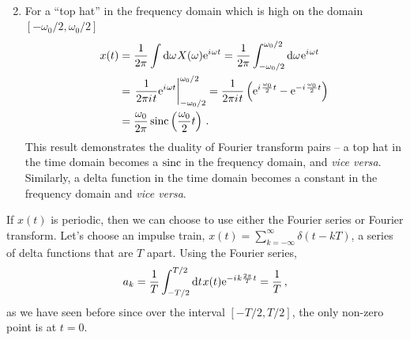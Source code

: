 \begin{enumerate}
\begin{align*}
  \end{align*}
\item For a ``top hat'' in the frequency domain which is high on the domain $[-\omega_0/2,\omega_0/2]$
  \begin{align*}
    x(t) &= \frac{1}{2\pi}\int \mathrm{d}\omega\mkern1muX(\omega)\mathrm{e}^{{i\mkern1mu}\omega t}
    = \frac{1}{2\pi}\int_{-\omega_0/2}^{\omega_0/2} \mathrm{d}\omega\mkern1mu \mathrm{e}^{{i\mkern1mu}\omega t} \\
    &= \left. \frac{1}{2\pi{i\mkern1mu} t} \mathrm{e}^{{i\mkern1mu}\omega t}\right|_{-\omega_0/2}^{\omega_0/2}
    = \frac{1}{2\pi{i\mkern1mu} t} \left(\mathrm{e}^{{i\mkern1mu}\frac{\omega_0}{2}t} - \mathrm{e}^{-{i\mkern1mu}\frac{\omega_0}{2}t}\right) \\
    &= \frac{\omega_0}{2\pi}\operatorname{sinc}\left(\frac{\omega_0}{2}t\right) \,.
  \end{align*}
  This result demonstrates the duality of Fourier transform pairs -- a top hat in the
  time domain becomes a $\operatorname{sinc}$ in the frequency domain, and \textit{vice versa}. Similarly,
  a delta function in the time domain becomes a constant in the frequency domain and
  \textit{vice versa}.
\end{enumerate}
%
If $x(t)$ is periodic, then we can choose to use either the Fourier series or Fourier
transform. Let's choose an impulse train, $x(t) = \sum_{k=-\infty}^\infty\delta(t - kT)$,
a series of delta functions that are $T$ apart. Using the Fourier series,
%
\begin{displaymath}
  a_k = \frac{1}{T}\int_{-T/2}^{T/2}\mathrm{d}t\mkern1mu x(t)\mathrm{e}^{-{i\mkern1mu} k\frac{2\pi}{T}t} = \frac{1}{T} \,,
\end{displaymath}
%
as we have seen before since over the interval $[-T/2,T/2]$, the only non-zero point is
at $t=0$.


